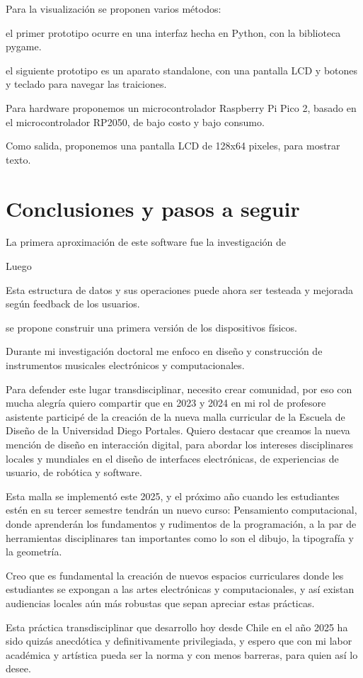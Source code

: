 \documentclass{article}
\begin{document}
Para la visualización se proponen varios métodos:

el primer prototipo ocurre en una interfaz hecha en Python, con la biblioteca pygame.

el siguiente prototipo es un aparato standalone, con una pantalla LCD y botones y teclado para navegar las traiciones.

Para hardware proponemos un microcontrolador Raspberry Pi Pico 2, basado en el microcontrolador RP2050, de bajo costo y bajo consumo.

Como salida, proponemos una pantalla LCD de 128x64 pixeles, para mostrar texto.

\clearpage

\section{Conclusiones y pasos a seguir}


La primera aproximación de este software fue la investigación de

Luego

Esta estructura de datos y sus operaciones puede ahora ser testeada y mejorada según feedback de los usuarios.

se propone construir una primera versión de los dispositivos físicos.

Durante mi investigación doctoral me enfoco en diseño y construcción de instrumentos musicales electrónicos y computacionales.

Para defender este lugar transdisciplinar, necesito crear comunidad, por eso con mucha alegría quiero compartir que en 2023 y 2024 en mi rol de profesore asistente participé de la creación de la nueva malla curricular de la Escuela de Diseño de la Universidad Diego Portales. Quiero destacar que creamos la nueva mención de diseño en interacción digital, para abordar los intereses disciplinares locales y mundiales en el diseño de interfaces electrónicas, de experiencias de usuario, de robótica y software.

Esta malla se implementó este 2025, y el próximo año cuando les estudiantes estén en su tercer semestre tendrán un nuevo curso: Pensamiento computacional, donde aprenderán los fundamentos y rudimentos de la programación, a la par de herramientas disciplinares tan importantes como lo son el dibujo, la tipografía y la geometría.

Creo que es fundamental la creación de nuevos espacios curriculares donde les estudiantes se expongan a las artes electrónicas y computacionales, y así existan audiencias locales aún más robustas que sepan apreciar estas prácticas.

Esta práctica transdisciplinar que desarrollo hoy desde Chile en el año 2025 ha sido quizás anecdótica y definitivamente privilegiada, y espero que con mi labor académica y artística pueda ser la norma y con menos barreras, para quien así lo desee.

\clearpage

\printbibliography[title={Bibliografía}, heading=bibintoc]
\end{document}
